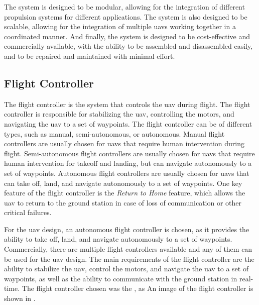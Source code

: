 The system is designed to be modular, allowing for the integration of different propulsion systems for different applications. The system is also designed to be scalable, allowing for the integration of multiple \glspl{uav} working together in a coordinated manner. And finally, the system is designed to be cost-effective and commercially available, with the ability to be assembled and disassembled easily, and to be repaired and maintained with minimal effort.


\subsection{Flight Controller}

The flight controller is the system that controls the \gls{uav} during flight. The flight controller is responsible for stabilizing the \gls{uav}, controlling the motors, and navigating the \gls{uav} to a set of waypoints. The flight controller can be of different types, such as manual, semi-autonomous, or autonomous. Manual flight controllers are usually chosen for \glspl{uav} that require human intervention during flight. Semi-autonomous flight controllers are usually chosen for \glspl{uav} that require human intervention for takeoff and landing, but can navigate autonomously to a set of waypoints. Autonomous flight controllers are usually chosen for \glspl{uav} that can take off, land, and navigate autonomously to a set of waypoints. One key feature of the flight controller is the \textit{Return to Home} feature, which allows the \gls{uav} to return to the ground station in case of loss of communication or other critical failures.

For the \gls{uav} design, an autonomous flight controller is chosen, as it provides the ability to take off, land, and navigate autonomously to a set of waypoints. Commercially, there are multiple flight controllers available  and any of them can be used for the \gls{uav} design. The main requirements of the flight controller are the ability to stabilize the \gls{uav}, control the motors, and navigate the \gls{uav} to a set of waypoints, as well as the ability to communicate with the ground station in real-time. The flight controller chosen was the , as  An image of the flight controller is shown in .


